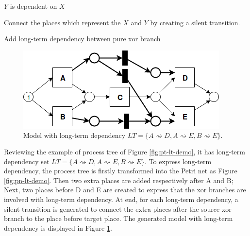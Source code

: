 \begin{algorithm}[!ht]
	\SetAlgoLined
	$Y$ is dependent on $X$\;
	
	Connect the places which represent the $X$ and $Y$ by creating a silent transition.
	\caption{Add long-term dependency between pure xor branch}
	\label{alg: Adding method}
\end{algorithm}
\begin{figure}
	\includegraphics[width=\textwidth]{figures/algorithm/LT_Seq_01_Silent_01.png}
	\caption{Model with long-term dependency $LT=\{ A\rightsquigarrow D, A\rightsquigarrow E, B\rightsquigarrow E\}. $ }
	\label{fig:pn-demo-with-lt}
\end{figure}
Reviewing the example of process tree of Figure \ref{fig:pt-lt-demo}, it has long-term dependency set $LT=\{ A\rightsquigarrow D, A\rightsquigarrow E, B\rightsquigarrow E\}$. To express long-term dependency,  the process tree is firstly transformed into the Petri net as Figure \ref{fig:pn-lt-demo}. Then two extra places are added respectively after A and B; Next, two places before D and E are created to express that the xor branches are involved with long-term dependency. At end, for each long-term dependency, a silent transition is generated to connect the extra places after the source xor branch to the place before target place. The generated model with long-term dependency is displayed in Figure \ref{fig:pn-demo-with-lt}.

